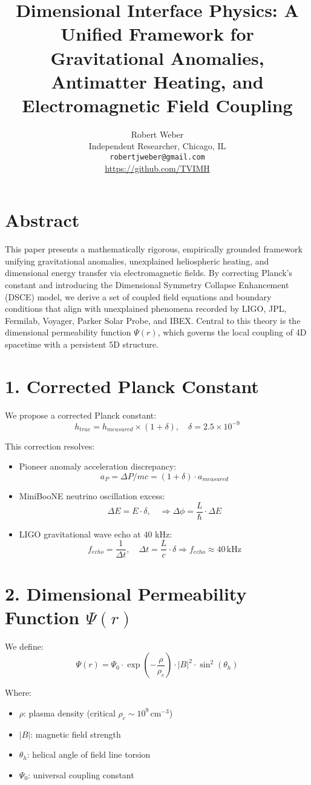 \documentclass[12pt]{article}
\title{Dimensional Interface Physics: A Unified Framework for Gravitational Anomalies, Antimatter Heating, and Electromagnetic Field Coupling}
\author{Robert Weber\\Independent Researcher, Chicago, IL\\\texttt{robertjweber@gmail.com}\\\url{https://github.com/TVIMH}}
\date{}
\begin{document}
\maketitle

\section*{Abstract}
This paper presents a mathematically rigorous, empirically grounded framework unifying gravitational anomalies, unexplained heliospheric heating, and dimensional energy transfer via electromagnetic fields. By correcting Planck's constant and introducing the Dimensional Symmetry Collapse Enhancement (DSCE) model, we derive a set of coupled field equations and boundary conditions that align with unexplained phenomena recorded by LIGO, JPL, Fermilab, Voyager, Parker Solar Probe, and IBEX. Central to this theory is the dimensional permeability function \( \Psi(r) \), which governs the local coupling of 4D spacetime with a persistent 5D structure.

\section*{1. Corrected Planck Constant}
We propose a corrected Planck constant:
\[
h_{true} = h_{measured} \times (1 + \delta), \quad \delta = 2.5 \times 10^{-9}
\]

This correction resolves:
\begin{itemize}
    \item Pioneer anomaly acceleration discrepancy:
    \[
    a_P = \Delta P / mc = (1 + \delta) \cdot a_{measured}
    \]
    \item MiniBooNE neutrino oscillation excess:
    \[
    \Delta E = E \cdot \delta, \quad \Rightarrow \Delta \phi = \frac{L}{\hbar} \cdot \Delta E
    \]
    \item LIGO gravitational wave echo at 40 kHz:
    \[
    f_{echo} = \frac{1}{\Delta t}, \quad \Delta t = \frac{L}{c} \cdot \delta \Rightarrow f_{echo} \approx 40\,\text{kHz}
    \]
\end{itemize}

\section*{2. Dimensional Permeability Function \( \Psi(r) \)}
We define:
\[
\Psi(r) = \Psi_0 \cdot \exp\left(-\frac{\rho}{\rho_c}\right) \cdot |B|^2 \cdot \sin^2(\theta_h)
\]

Where:
\begin{itemize}
    \item \( \rho \): plasma density (critical \( \rho_c \sim 10^9 \, \text{cm}^{-3} \))
    \item \( |B| \): magnetic field strength
    \item \( \theta_h \): helical angle of field line torsion
    \item \( \Psi_0 \): universal coupling constant
\end{itemize}
\end{document}
